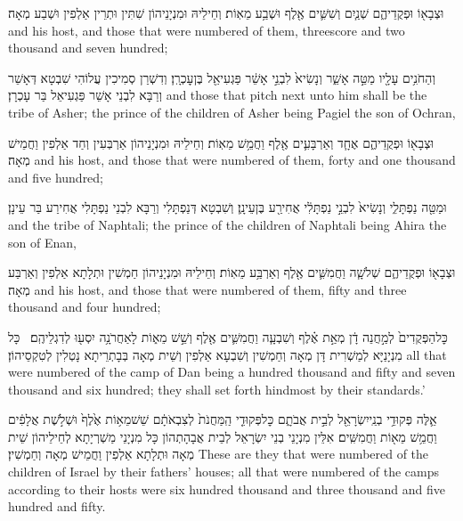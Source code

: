 {וּצְבָא֖וֹ וּפְקֻדֵיהֶ֑ם שְׁנַ֧יִם וְשִׁשִּׁ֛ים אֶ֖לֶף וּשְׁבַ֥ע מֵאֽוֹת׃}
{וְחֵילֵיהּ וּמִנְיָנֵיהוֹן שִׁתִּין וּתְרֵין אַלְפִין וּשְׁבַע מְאָה׃}
{and his host, and those that were numbered of them, threescore and two thousand and seven hundred;}{}

{וְהַחֹנִ֥ים עָלָ֖יו מַטֵּ֣ה אָשֵׁ֑ר וְנָשִׂיא֙ לִבְנֵ֣י אָשֵׁ֔ר פַּגְעִיאֵ֖ל בֶּן\maqqaf עׇכְרָֽן׃}
{וְדִשְׁרַן סְמִיכִין עֲלוֹהִי שִׁבְטָא דְּאָשֵׁר וְרַבָּא לִבְנֵי אָשֵׁר פַּגְעִיאֵל בַּר עָכְרָן׃}
{and those that pitch next unto him shall be the tribe of Asher; the prince of the children of Asher being Pagiel the son of Ochran,}{}

{וּצְבָא֖וֹ וּפְקֻדֵיהֶ֑ם אֶחָ֧ד וְאַרְבָּעִ֛ים אֶ֖לֶף וַחֲמֵ֥שׁ מֵאֽוֹת׃}
{וְחֵילֵיהּ וּמִנְיָנֵיהוֹן אַרְבְּעִין וְחַד אַלְפִין וַחֲמֵישׁ מְאָה׃}
{and his host, and those that were numbered of them, forty and one thousand and five hundred;}{}

{וּמַטֵּ֖ה נַפְתָּלִ֑י וְנָשִׂיא֙ לִבְנֵ֣י נַפְתָּלִ֔י אֲחִירַ֖ע בֶּן\maqqaf עֵינָֽן׃}
{וְשִׁבְטָא דְּנַפְתָּלִי וְרַבָּא לִבְנֵי נַפְתָּלִי אֲחִירַע בַּר עֵינָן׃}
{and the tribe of Naphtali; the prince of the children of Naphtali being Ahira the son of Enan,}{}

{וּצְבָא֖וֹ וּפְקֻדֵיהֶ֑ם שְׁלֹשָׁ֧ה וַחֲמִשִּׁ֛ים אֶ֖לֶף וְאַרְבַּ֥ע מֵאֽוֹת׃}
{וְחֵילֵיהּ וּמִנְיָנֵיהוֹן חַמְשִׁין וּתְלָתָא אַלְפִין וְאַרְבַּע מְאָה׃}
{and his host, and those that were numbered of them, fifty and three thousand and four hundred;}{}

{כׇּל\maqqaf הַפְּקֻדִים֙ לְמַ֣חֲנֵה דָ֔ן מְאַ֣ת אֶ֗לֶף וְשִׁבְעָ֧ה וַחֲמִשִּׁ֛ים אֶ֖לֶף וְשֵׁ֣שׁ מֵא֑וֹת לָאַחֲרֹנָ֥ה יִסְע֖וּ לְדִגְלֵיהֶֽם׃ \petucha }
{כָּל מִנְיָנַיָּא לְמַשְׁרִית דָּן מְאָה וְחַמְשִׁין וְשִׁבְעָא אַלְפִין וְשֵׁית מְאָה בְּבָתְרֵיתָא נָטְלִין לְטִקְסֵיהוֹן׃}
{all that were numbered of the camp of Dan being a hundred thousand and fifty and seven thousand and six hundred; they shall set forth hindmost by their standards.’}{}

{אֵ֛לֶּה פְּקוּדֵ֥י בְנֵֽי\maqqaf יִשְׂרָאֵ֖ל לְבֵ֣ית אֲבֹתָ֑ם כׇּל\maqqaf פְּקוּדֵ֤י הַֽמַּחֲנֹת֙ לְצִבְאֹתָ֔ם שֵׁשׁ\maqqaf מֵא֥וֹת אֶ֙לֶף֙ וּשְׁלֹ֣שֶׁת אֲלָפִ֔ים וַחֲמֵ֥שׁ מֵא֖וֹת וַחֲמִשִּֽׁים׃}
{אִלֵּין מִנְיָנֵי בְנֵי יִשְׂרָאֵל לְבֵית אֲבָהָתְהוֹן כָּל מִנְיָנֵי מַשְׁרְיָתָא לְחֵילֵיהוֹן שֵׁית מְאָה וּתְלָתָא אַלְפִין וַחֲמֵישׁ מְאָה וְחַמְשִׁין׃}
{These are they that were numbered of the children of Israel by their fathers’ houses; all that were numbered of the camps according to their hosts were six hundred thousand and three thousand and five hundred and fifty.}{}

